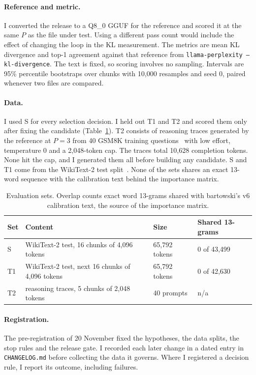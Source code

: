 \documentclass[11pt,a4paper]{article}
\newcommand{\code}[1]{\texttt{#1}}
\begin{document}
\paragraph{Reference and metric.} I converted the release to a Q8\_0 GGUF for the reference and scored it at the same $P$ as the file under test. Using a different pass count would include the effect of changing the loop in the KL measurement. The metrics are mean KL divergence and top-1 agreement against that reference from \code{llama-perplexity --kl-divergence}. The text is fixed, so scoring involves no sampling. Intervals are 95\% percentile bootstraps over chunks with 10,000 resamples and seed 0, paired whenever two files are compared.

\paragraph{Data.} I used S for every selection decision. I held out T1 and T2 and scored them only after fixing the candidate (Table~\ref{tab:data}). T2 consists of reasoning traces generated by the reference at $P = 3$ from 40 GSM8K training questions~\citep{gsm8k} with low effort, temperature 0 and a 2,048-token cap. The traces total 10,628 completion tokens. None hit the cap, and I generated them all before building any candidate. S and T1 come from the WikiText-2 test split~\citep{wikitext}. None of the sets shares an exact 13-word sequence with the calibration text behind the importance matrix.

\begin{table}[t]
\centering\small
\caption{Evaluation sets. Overlap counts exact word 13-grams shared with bartowski's v6 calibration text, the source of the importance matrix.}
\label{tab:data}
\begin{tabular}{llll}
\toprule
Set & Content & Size & Shared 13-grams \\
\midrule
S & WikiText-2 test, 16 chunks of 4,096 tokens & 65,792 tokens & 0 of 43,499 \\
T1 & WikiText-2 test, next 16 chunks of 4,096 tokens & 65,792 tokens & 0 of 42,630 \\
T2 & reasoning traces, 5 chunks of 2,048 tokens & 40 prompts & n/a \\
\bottomrule
\end{tabular}
\end{table}

\paragraph{Registration.} The pre-registration of 20 November fixed the hypotheses, the data splits, the stop rules and the release gate. I recorded each later change in a dated entry in \code{CHANGELOG.md} before collecting the data it governs. Where I registered a decision rule, I report its outcome, including failures.
\end{document}
